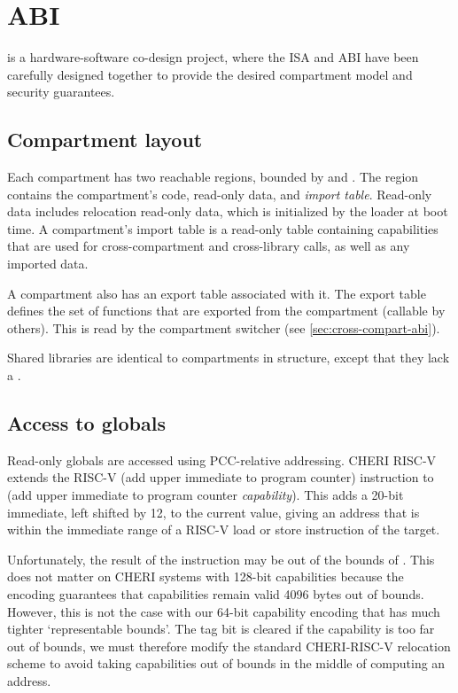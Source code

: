 \chapter{ABI}
\label{chap:abi}

\cherimcu{} is a hardware-software co-design project, where the ISA and ABI have been carefully designed together to provide the desired compartment model and security guarantees.

\section{Compartment layout}

Each compartment has two reachable regions, bounded by \PCC{} and \CGP{}.
The \PCC{} region contains the compartment's code, read-only data, and \textit{import table}.
Read-only data includes relocation read-only data, which is initialized by the loader at boot time.
A compartment's import table is a read-only table containing capabilities that are used for cross-compartment and cross-library calls, as well as any imported data.

A compartment also has an export table associated with it.
The export table defines the set of functions that are exported from the compartment (callable by others).
This is read by the compartment switcher (see \cref{sec:cross-compart-abi}).

Shared libraries are identical to compartments in structure, except that they lack a \CGP{}.

\section{Access to globals}

Read-only globals are accessed using PCC-relative addressing.
CHERI RISC-V extends the RISC-V  (add upper immediate to program counter) instruction to  (add upper immediate to program counter \textit{capability}).
This adds a 20-bit immediate, left shifted by 12, to the current \PCC{} value, giving an address that is within the immediate range of a RISC-V load or store instruction of the target.

Unfortunately, the result of the  instruction may be out of the bounds of \PCC{}.
This does not matter on CHERI systems with 128-bit capabilities because the encoding guarantees that capabilities remain valid 4096 bytes out of bounds.
However, this is not the case with our 64-bit capability encoding that has much tighter `representable bounds'.
The tag bit is cleared if the capability is too far out of bounds, we must therefore modify the standard CHERI-RISC-V relocation scheme to avoid taking capabilities out of bounds in the middle of computing an address.

